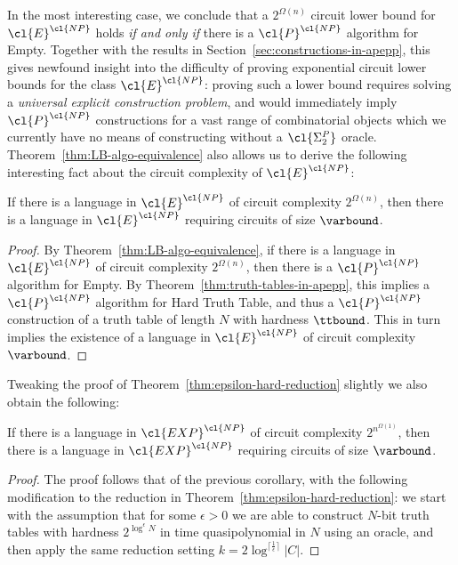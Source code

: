 In the most interesting case, we conclude that a $2^{\Omega(n)}$ circuit lower bound for $\cl{E}^\cl{NP}$ holds \emph{if and only if} there is a $\cl{P}^\cl{NP}$ algorithm for {\sc Empty}. Together with the results in Section~\ref{sec:constructions-in-apepp}, this gives newfound insight into the difficulty of proving exponential circuit lower bounds for the class $\cl{E}^\cl{NP}$: proving such a lower bound requires solving a \emph{universal explicit construction problem}, and would immediately imply $\cl{P}^\cl{NP}$ constructions for a vast range of combinatorial objects which we currently have no means of constructing without a $\cl{\Sigma_2^P}$ oracle. Theorem~\ref{thm:LB-algo-equivalence} also allows us to derive the following interesting fact about the circuit complexity of $\cl{E}^\cl{NP}$:
\begin{corollary}\label{cor:e-hard}
If there is a language in $\cl{E}^\cl{NP}$ of circuit complexity $2^{\Omega(n)}$, then there is a language in $\cl{E}^\cl{NP}$ requiring circuits of size $\varbound$.
\end{corollary}
\begin{proof}
By Theorem~\ref{thm:LB-algo-equivalence}, if  there is a language in $\cl{E}^\cl{NP}$ of circuit complexity $2^{\Omega(n)}$, then there is a $\cl{P}^\cl{NP}$ algorithm for {\sc Empty}. By Theorem~\ref{thm:truth-tables-in-apepp}, this implies a $\cl{P}^\cl{NP}$ algorithm for {\sc Hard Truth Table}, and thus a $\cl{P}^\cl{NP}$ construction of a truth table of length $N$ with hardness $\ttbound$. This in turn implies the existence of a language in $\cl{E}^\cl{NP}$ of circuit complexity $\varbound$.
\end{proof}

Tweaking the proof of Theorem~\ref{thm:epsilon-hard-reduction} slightly we also obtain the following:
\begin{corollary}\label{cor:exp-hard}
If there is a language in $\cl{EXP}^\cl{NP}$ of circuit complexity $2^{n^{\Omega(1)}}$, then there is a language in $\cl{EXP}^\cl{NP}$ requiring circuits of size $\varbound$.
\end{corollary}
\begin{proof}
The proof follows that of the previous corollary, with the following modification to the reduction in Theorem~\ref{thm:epsilon-hard-reduction}: we start with the assumption that for some $\epsilon>0$ we are able to construct $N$-bit truth tables with hardness $2^{\log^{\epsilon}N}$ in time quasipolynomial in $N$ using an  oracle, and then apply the same reduction setting $k = 2\log^{\lceil \frac{1}{\epsilon} \rceil} |C|$.
\end{proof}

